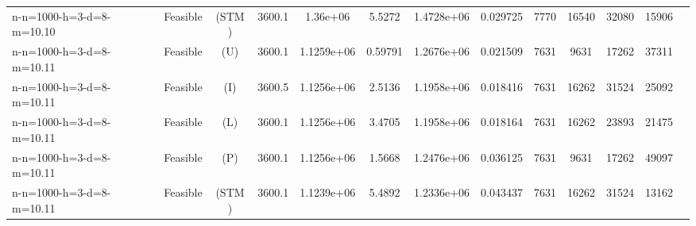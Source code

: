 \documentclass[landscape, a4paper]{article}
\newcommand{\STM}{\ensuremath{\mathrm{STM}}}
\newcommand{\Improved}{\ensuremath{\mathrm{I}}}
\newcommand{\Loose}{\ensuremath{\mathrm{L}}}
\newcommand{\Profit}{\ensuremath{\mathrm{P}}}
\newcommand{\Utility}{\ensuremath{\mathrm{U}}}
\begin{document}
\begin{center}
\begin{tabular}{lcccccccccccc}
n-n=1000-h=3-d=8-m=10.10 & Feasible & (\STM) & 3600.1 & 1.36e+06 & 5.5272 & 1.4728e+06 & 0.029725 & 7770 & 16540 & 32080 & 15906 & \\
n-n=1000-h=3-d=8-m=10.11 & Feasible & (\Utility) & 3600.1 & 1.1259e+06 & 0.59791 & 1.2676e+06 & 0.021509 & 7631 & 9631 & 17262 & 37311 & \\
n-n=1000-h=3-d=8-m=10.11 & Feasible & (\Improved) & 3600.5 & 1.1256e+06 & 2.5136 & 1.1958e+06 & 0.018416 & 7631 & 16262 & 31524 & 25092 & \\
n-n=1000-h=3-d=8-m=10.11 & Feasible & (\Loose) & 3600.1 & 1.1256e+06 & 3.4705 & 1.1958e+06 & 0.018164 & 7631 & 16262 & 23893 & 21475 & \\
n-n=1000-h=3-d=8-m=10.11 & Feasible & (\Profit) & 3600.1 & 1.1256e+06 & 1.5668 & 1.2476e+06 & 0.036125 & 7631 & 9631 & 17262 & 49097 & \\
n-n=1000-h=3-d=8-m=10.11 & Feasible & (\STM) & 3600.1 & 1.1239e+06 & 5.4892 & 1.2336e+06 & 0.043437 & 7631 & 16262 & 31524 & 13162 & \\
\end{tabular}
\end{center}
\end{document}

